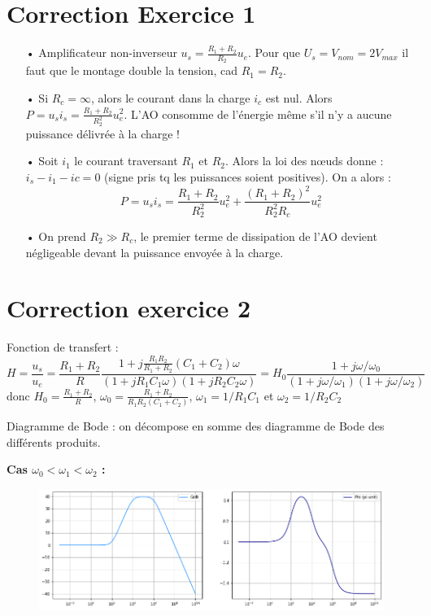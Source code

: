 \documentclass{report}
\begin{document}
\section*{Correction Exercice 1}

\begin{itemize}
	\item[•] Amplificateur non-inverseur $u_s = \frac{R_1+R_2}{R_2}u_e$. Pour que $U_s = V_{nom}=2V_{max}$ il faut que le montage double la tension, cad $R_1=R_2$.
	\item[•]  Si $R_c=\infty$, alors le courant dans la charge $i_c$ est nul. Alors $P=u_si_s= \frac{R_1+R_2}{R_2^2}u_e^2$. L'AO consomme de l'énergie même s'il n'y a aucune puissance délivrée à la charge !
	\item[•] Soit $i_1$ le courant traversant $R_1$ et $R_2$. Alors la loi des nœuds donne : $i_s-i_1-ic=0$ (signe pris tq les puissances soient positives). On a alors :
	\begin{equation}
		P=u_si_s=\frac{R_1+R_2}{R_2^2}u_e^2+\frac{(R_1+R_2)^2}{R_2^2R_c}u_e^2
	\end{equation}
	\item[•] On prend $R_2\gg R_c$, le premier terme de dissipation de l'AO devient négligeable devant la puissance envoyée à la charge.
\end{itemize}

\section*{Correction exercice 2}
Fonction de transfert :
\begin{equation}
	H=\frac{u_s}{u_e}=\frac{R_1+R_2}{R}\frac{1+j\frac{R_1R_2}{R_1+R_2}(C_1+C_2)\omega}{(1+jR_1C_1\omega)(1+jR_2C_2\omega)}=H_0\frac{1+j\omega/\omega_0}{(1+j\omega/\omega_1)(1+j\omega/\omega_2)}
\end{equation}
donc $H_0=\frac{R_1+R_2}{R}$, $\omega_0=\frac{R_1+R_2}{R_1R_2(C_1+C_2)}$, $\omega_1=1/R_1C_1$ et $\omega_2=1/R_2C_2$

Diagramme de Bode : on décompose en somme des diagramme de Bode des différents produits.

\textbf{Cas $\omega_0<\omega_1<\omega_2$ :}
\begin{figure}[!h]
	\centering
	\includegraphics[width=0.8\linewidth]{exo2_0.png}
\end{figure}
\end{document}
